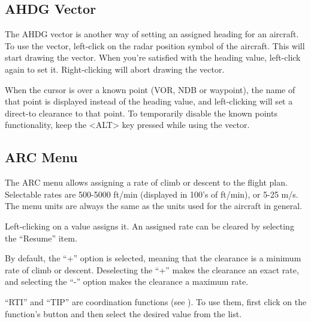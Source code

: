 \documentclass[a4paper,oneside,11pt]{memoir}
\begin{document}
\subsection{AHDG Vector}
\label{menu:ahdgv}
The AHDG vector is another way of setting an assigned heading for an aircraft. To use the vector, left-click on the radar position symbol of the aircraft. This will start drawing the vector. When you’re satisfied with the heading value, left-click again to set it. Right-clicking will abort drawing the vector.

\bigskip

When the cursor is over a known point (VOR, NDB or waypoint), the name of that point is displayed instead of the heading value, and left-clicking will set a direct-to clearance to that point. To temporarily disable the known points functionality, keep the <ALT> key pressed while using the vector.

\subsection{ARC Menu}
\label{menu:arc}


The ARC menu allows assigning a rate of climb or descent to the flight plan. Selectable rates are 500-5000 ft/min (displayed in 100’s of ft/min), or 5-25 m/s. The menu units are always the same as the units used for the aircraft in general.

\bigskip

Left-clicking on a value assigns it. An assigned rate can be cleared by selecting the “Resume” item.

\bigskip

By default, the “+” option is selected, meaning that the clearance is a minimum rate of climb or descent. Deselecting the “+” makes the clearance an exact rate, and selecting the “-” option makes the clearance a maximum rate.

\bigskip

“RTI” and “TIP” are coordination functions (see ). To use them, first click on the function’s button and then select the desired value from the list.

\end{document}
